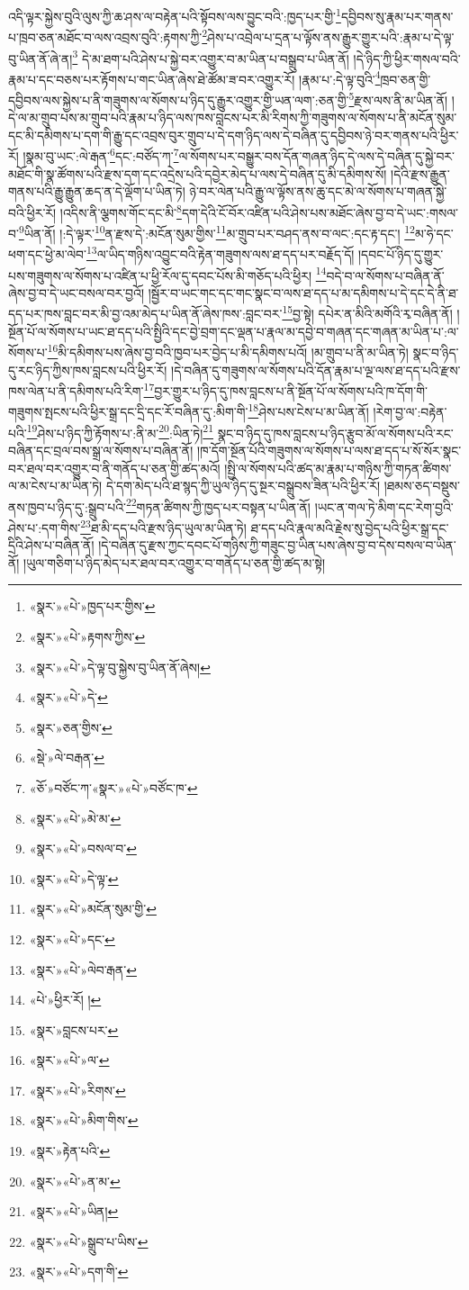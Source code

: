འདི་ལྟར་སྐྱེས་བུའི་ལུས་ཀྱི་ཆ་ཤས་ལ་བརྟེན་པའི་སྟོབས་ལས་བྱུང་བའི་:ཁྱད་པར་གྱི་\footnote{«སྣར་»«པེ་»ཁྱད་པར་གྱིས་}དབྱིབས་སུ་རྣམ་པར་གནས་པ་ཁྲབ་ཅན་མཐོང་བ་ལས་འབྲས་བུའི་:རྟགས་ཀྱི་\footnote{«སྣར་»«པེ་»རྟགས་ཀྱིས་}ཤེས་པ་འབྲེལ་པ་དྲན་པ་ལྟོས་ནས་རྒྱུར་གྱུར་པའི་:རྣམ་པ་དེ་ལྟ་བུ་ཡིན་ནོ་ཞེ་ན།\footnote{«སྣར་»«པེ་»དེ་ལྟ་བུ་སྐྱེས་བུ་ཡིན་ནོ་ཞེས།} དེ་མ་ཐག་པའི་ཤེས་པ་སྐྱེ་བར་འགྱུར་བ་མ་ཡིན་པ་བསྒྲུབ་པ་ཡིན་ནོ། །དེ་ཉིད་ཀྱི་ཕྱིར་གསལ་བའི་རྣམ་པ་དང་བཅས་པར་རྟོགས་པ་གང་ཡིན་ཞེས་ཐེ་ཚོམ་ཟ་བར་འགྱུར་རོ། །རྣམ་པ་:དེ་ལྟ་བུའི་\footnote{«སྣར་»«པེ་»དེ་}ཁྲབ་ཅན་གྱི་དབྱིབས་ལས་སྐྱེས་པ་ནི་གཟུགས་ལ་སོགས་པ་ཉིད་དུ་རྒྱུར་འགྱུར་གྱི་ཡན་ལག་:ཅན་གྱི་\footnote{«སྣར་»ཅན་གྱིས་}རྫས་ལས་ནི་མ་ཡིན་ནོ། །དེ་ལ་མ་གྲུབ་པས་མ་གྲུབ་པའི་རྣམ་པ་ཉིད་ལས་ཁས་བླངས་པར་མི་རིགས་ཀྱི་གཟུགས་ལ་སོགས་པ་ནི་མངོན་སུམ་དང་མི་དམིགས་པ་དག་གི་རྒྱུ་དང་འབྲས་བུར་གྲུབ་པ་དེ་དག་ཉིད་ལས་དེ་བཞིན་དུ་དབྱིབས་ཉེ་བར་གནས་པའི་ཕྱིར་རོ། །སྣམ་བུ་ཡང་:ལེ་རྒན་\footnote{«སྡེ་»ལེ་བརྒན་}དང་:བཙོད་ཀ་\footnote{«ཅོ་»བཙོང་ཀ་«སྣར་»«པེ་»བཙོང་ཁ་}ལ་སོགས་པར་བསྒྱུར་བས་དོན་གཞན་ཉིད་དེ་ལས་དེ་བཞིན་དུ་སྐྱེ་བར་མཐོང་གི་སྣ་ཚོགས་པའི་རྫས་དག་དང་འདྲེས་པའི་དབྱེར་མེད་པ་ལས་དེ་བཞིན་དུ་མི་དམིགས་སོ། །དེའི་རྫས་རྒྱུན་གནས་པའི་རྒྱུ་རྒྱུན་ཆད་ན་དེ་ལྡོག་པ་ཡིན་ཏེ། ཉེ་བར་ལེན་པའི་རྒྱུ་ལ་ལྟོས་ནས་ཆུ་དང་མེ་ལ་སོགས་པ་གཞན་སྐྱེ་བའི་ཕྱིར་རོ། །འདིས་ནི་ལྕགས་གོང་དང་མི་\footnote{«སྣར་»«པེ་»མེ་མ་}དག་དེའི་ངོ་བོར་འཛིན་པའི་ཤེས་པས་མཐོང་ཞེས་བྱ་བ་དེ་ཡང་:གསལ་བ་\footnote{«སྣར་»«པེ་»བསལ་བ་}ཡིན་ནོ། །:དེ་ལྟར་\footnote{«སྣར་»«པེ་»དེ་ལྟ་}ན་རྫས་དེ་:མངོན་སུམ་གྱིས་\footnote{«སྣར་»«པེ་»མངོན་སུམ་གྱི་}མ་གྲུབ་པར་བཤད་ནས་བ་ལང་:དང་རྟ་དང་། \footnote{«སྣར་»«པེ་»དང་}མ་ཧེ་དང་ཕག་དང་ཕྱེ་མ་ལེབ་\footnote{«སྣར་»«པེ་»ལེབ་རྒན་}ལ་ཡིད་གཉིས་འབྱུང་བའི་རྟེན་གཟུགས་ལས་ཐ་དད་པར་བརྗོད་དོ། །དབང་པོ་ཉིད་དུ་གྱུར་པས་གཟུགས་ལ་སོགས་པ་འཛིན་པ་ཕྱི་རོལ་དུ་དབང་པོས་མི་གཅོད་པའི་ཕྱིར། \footnote{«པེ་»ཕྱིར་རོ། ། }བདེ་བ་ལ་སོགས་པ་བཞིན་ནོ་ཞེས་བྱ་བ་དེ་ཡང་བསལ་བར་བྱའོ། །སྦྱོར་བ་ཡང་གང་དང་གང་སྣང་བ་ལས་ཐ་དད་པ་མ་དམིགས་པ་དེ་དང་དེ་ནི་ཐ་དད་པར་ཁས་བླང་བར་མི་བྱ་འམ་མེད་པ་ཡིན་ནོ་ཞེས་ཁས་:བླང་བར་\footnote{«སྣར་»བླངས་པར་}བྱ་སྟེ། དཔེར་ན་མིའི་མགོའི་རྭ་བཞིན་ནོ། །སྔོན་པོ་ལ་སོགས་པ་ཡང་ཐ་དད་པའི་སྤྱིའི་དང་བྱེ་བྲག་དང་ལྡན་པ་རྣལ་མ་དབྱེ་བ་གཞན་དང་གཞན་མ་ཡིན་པ་:ལ་སོགས་པ་\footnote{«སྣར་»«པེ་»ལ་}མི་དམིགས་པས་ཞེས་བྱ་བའི་ཁྱབ་པར་བྱེད་པ་མི་དམིགས་པའོ། །མ་གྲུབ་པ་ནི་མ་ཡིན་ཏེ། སྣང་བ་ཉིད་དུ་རང་ཉིད་ཀྱིས་ཁས་བླངས་པའི་ཕྱིར་རོ། །དེ་བཞིན་དུ་གཟུགས་ལ་སོགས་པའི་དོན་རྣམ་པ་ལྔ་ལས་ཐ་དད་པའི་རྫས་ཁས་ལེན་པ་ནི་དམིགས་པའི་རིག་\footnote{«སྣར་»«པེ་»རིགས་}བྱར་གྱུར་པ་ཉིད་དུ་ཁས་བླངས་པ་ནི་སྔོན་པོ་ལ་སོགས་པའི་ཁ་དོག་གི་གཟུགས་སྤངས་པའི་ཕྱིར་སྒྲ་དང་དྲི་དང་རོ་བཞིན་དུ་:མིག་གི་\footnote{«སྣར་»«པེ་»མིག་གིས་}ཤེས་པས་ངེས་པ་མ་ཡིན་ནོ། །རེག་བྱ་ལ་:བརྟེན་པའི་\footnote{«སྣར་»རྟེན་པའི་}ཤེས་པ་ཉིད་ཀྱི་རྟོགས་པ་:ནི་མ་\footnote{«སྣར་»«པེ་»ན་མ་}:ཡིན་ཏེ།\footnote{«སྣར་»«པེ་»ཡིན།} སྣང་བ་ཉིད་དུ་ཁས་བླངས་པ་ཉིད་རྩུབ་མོ་ལ་སོགས་པའི་རང་བཞིན་དང་བྲལ་བས་སྒྲ་ལ་སོགས་པ་བཞིན་ནོ། །ཁ་དོག་སྔོན་པོའི་གཟུགས་ལ་སོགས་པ་ལས་ཐ་དད་པ་སོ་སོར་སྣང་བར་ཐལ་བར་འགྱུར་བ་ནི་གནོད་པ་ཅན་གྱི་ཚད་མའོ། །སྤྱི་ལ་སོགས་པའི་ཚད་མ་རྣམ་པ་གཉིས་ཀྱི་གཏན་ཚིགས་ལ་མ་ངེས་པ་མ་ཡིན་ཏེ། དེ་དག་མེད་པའི་ཐ་སྙད་ཀྱི་ཡུལ་ཉིད་དུ་སྔར་བསྒྲུབས་ཟིན་པའི་ཕྱིར་རོ། །ཐམས་ཅད་བསྡུས་ནས་ཁྱབ་པ་ཉིད་དུ་:སྒྲུབ་པའི་\footnote{«སྣར་»«པེ་»སྒྲུབ་པ་ཡིས་}གཏན་ཚིགས་ཀྱི་ཁྱད་པར་བསྟན་པ་ཡིན་ནོ། །ཡང་ན་གལ་ཏེ་མིག་དང་རེག་བྱའི་ཤེས་པ་:དག་གིས་\footnote{«སྣར་»«པེ་»དག་གི་}ཐ་མི་དད་པའི་རྫས་ཉིད་ཡུལ་མ་ཡིན་ཏེ། ཐ་དད་པའི་རྣལ་མའི་རྗེས་སུ་བྱེད་པའི་ཕྱིར་སྒྲ་དང་དྲིའི་ཤེས་པ་བཞིན་ནོ། །དེ་བཞིན་དུ་རྫས་ཀྱང་དབང་པོ་གཉིས་ཀྱི་གཟུང་བྱ་ཡིན་པས་ཞེས་བྱ་བ་དེས་བསལ་བ་ཡིན་ནོ། །ཡུལ་གཅིག་པ་ཉིད་མེད་པར་ཐལ་བར་འགྱུར་བ་གནོད་པ་ཅན་གྱི་ཚད་མ་སྟེ། 
